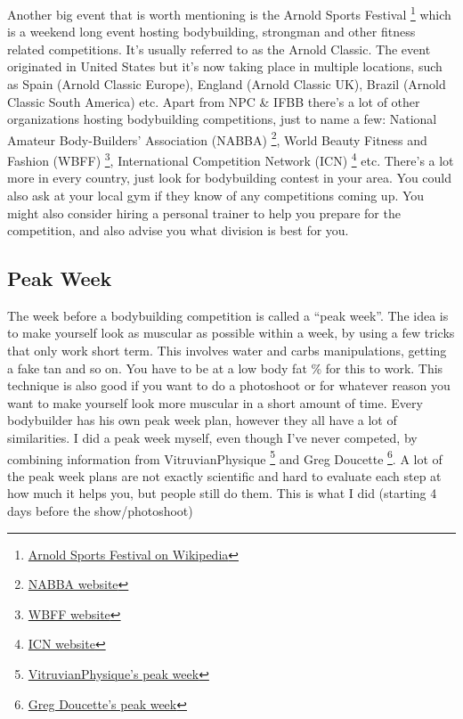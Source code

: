 \documentclass[openany, 12pt]{book}
\begin{document}
        Another big event that is worth mentioning is the Arnold Sports Festival
        \footnote{\href{https://en.wikipedia.org/wiki/Arnold_Sports_Festival/}{Arnold Sports Festival on Wikipedia}} which is a weekend long event hosting bodybuilding, strongman and other fitness
        related competitions. It's usually referred to as the Arnold Classic. The event originated in United States but it's now taking place in multiple locations, such as Spain (Arnold Classic
        Europe), England (Arnold Classic UK), Brazil (Arnold Classic South America) etc. Apart from NPC \& IFBB there's a lot of other organizations hosting bodybuilding competitions, just to name
        a few: National Amateur Body-Builders' Association (NABBA)
        \footnote{\href{https://www.nabba.co.uk/}{NABBA website}}, World Beauty Fitness and Fashion (WBFF)
        \footnote{\href{https://wbffshows.com/}{WBFF website}}, International Competition Network (ICN)
        \footnote{\href{https://www.theedge.com.au/icn-nsw/}{ICN website}} etc. There's a lot more in every country, just look for bodybuilding contest in your area. You could also ask at your local
        gym if they know of any competitions coming up. You might also consider hiring a personal trainer to help you prepare for the competition, and also advise you what division is best for you.

        \subsection{Peak Week}

        The week before a bodybuilding competition is called a ``peak week''. The idea is to make yourself look as muscular as possible within a week,
        by using a few tricks that only work short term. This involves water and carbs manipulations, getting a fake tan and so on. You have to be at a low body fat \% for this to work.
        This technique is also good if you want to do a photoshoot or for whatever reason you want to make yourself look more muscular in a short amount of time. Every bodybuilder has his own peak week
        plan, however they all have a lot of similarities. I did a peak week myself, even though I've never competed, by combining information from VitruvianPhysique
        \footnote{\href{https://www.youtube.com/watch?v=oa2LLw-_I0U}{VitruvianPhysique's peak week}} and Greg Doucette
        \footnote{\href{https://www.youtube.com/watch?v=gCrZF_MMovs}{Greg Doucette's peak week}}. A lot of the peak week plans are not exactly scientific and hard to evaluate each step at how much
        it helps you, but people still do them. This is what I did (starting 4 days before the show/photoshoot)
        
\end{document}
